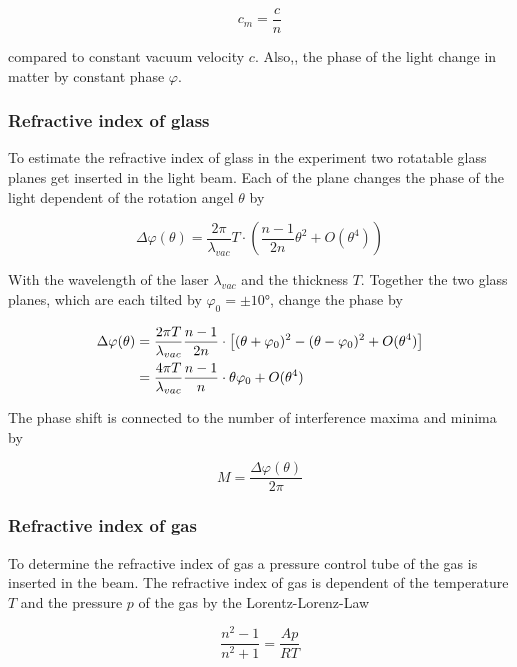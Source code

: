 \begin{equation}
	c_m=\frac{c}{n}
\end{equation}

compared to constant vacuum velocity $c$. Also,, the phase of the light change
in matter by constant phase $\varphi $.

\subsubsection{Refractive index of glass}
To estimate the refractive index of glass in the experiment two rotatable glass
planes get inserted in the light beam. Each of the plane changes the phase of
the light dependent of the rotation angel $\theta $ by

\begin{equation}
	\Delta \varphi(\theta ) =\frac{2\pi }{\lambda_{vac}}T \cdot \left(\frac{n-1}{2n}\theta ^2 +O(\theta ^4)  \right)
\end{equation}

With the wavelength of the laser $\lambda_{vac}$ and the thickness $T$.
Together the two glass planes, which are each tilted by $\varphi_0=\pm 10°$,
change the phase by

\begin{align}
	\Delta \varphi(\theta ) & =\frac{2\pi T}{\lambda_{vac}} \frac{n-1}{2n} \cdot \left[(\theta+\varphi_0)^2 - (\theta-\varphi_0)^2 +O(\theta ^4)  \right] \notag \\
	                        & =\frac{4\pi T}{\lambda_{vac}} \frac{n-1}{n} \cdot \theta\varphi_0 +O(\theta ^4)
\end{align}\label{eq:glass}

The phase shift is connected to the number of interference maxima and minima by

\begin{equation}
	M=\frac{\Delta \varphi(\theta)}{2\pi}
\end{equation}

\subsubsection{Refractive index of gas}
To determine the refractive index of gas a pressure control tube of the gas is
inserted in the beam. The refractive index of gas is dependent of the
temperature $T$ and the pressure $p$ of the gas by the Lorentz-Lorenz-Law

\begin{equation}
	\frac{n^2-1}{n^2+1}=\frac{Ap}{RT}
\end{equation}

